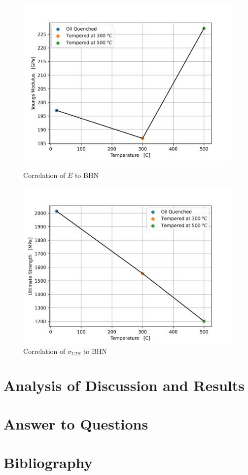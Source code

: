 \documentclass{article}
\begin{document}
\begin{figure}[!h!]
\begin{minipage}[b]{.5\linewidth}
    \includegraphics[width=\linewidth]{plots/q6_youngs.png}
    \caption{Correlation of $E$ to BHN}
    \label{fig:q6-youngs}
    \vspace{4ex}
\end{minipage}
\begin{minipage}[b]{.5\linewidth}
    \includegraphics[width=\linewidth]{plots/q6_uts.png}
    \caption{Correlation of $\sigma_{UTS}$ to BHN}
    \label{fig:q6-uts}
    \vspace{4ex}
\end{minipage}
\end{figure}
\newpage
\section{Analysis of Discussion and Results}

\section{Answer to Questions}

\section{Bibliography}
\end{document}
